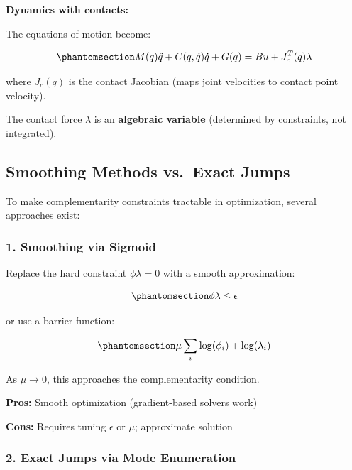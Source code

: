 \documentclass[
  letterpaper,
  DIV=11,
  numbers=noendperiod]{scrartcl}
\begin{document}
\textbf{Dynamics with contacts:}

The equations of motion become:

\begin{equation}\phantomsection\label{eq-contact-dynamics}{
M(q)\ddot{q} + C(q, \dot{q})\dot{q} + G(q) = B u + J_c^T(q) \lambda
}\end{equation}

where \(J_c(q)\) is the contact Jacobian (maps joint velocities to
contact point velocity).

The contact force \(\lambda\) is an \textbf{algebraic variable}
(determined by constraints, not integrated).

\subsection{Smoothing Methods vs.~Exact
Jumps}\label{smoothing-methods-vs.-exact-jumps}

To make complementarity constraints tractable in optimization, several
approaches exist:

\subsubsection{1. Smoothing via Sigmoid}\label{smoothing-via-sigmoid}

Replace the hard constraint \(\phi \lambda = 0\) with a smooth
approximation:

\begin{equation}\phantomsection\label{eq-smooth-complementarity}{
\phi \lambda \leq \epsilon
}\end{equation}

or use a barrier function:

\begin{equation}\phantomsection\label{eq-barrier}{
\mu \sum_i \log(\phi_i) + \log(\lambda_i)
}\end{equation}

As \(\mu \to 0\), this approaches the complementarity condition.

\textbf{Pros:} Smooth optimization (gradient-based solvers work)

\textbf{Cons:} Requires tuning \(\epsilon\) or \(\mu\); approximate
solution

\subsubsection{2. Exact Jumps via Mode
Enumeration}\label{exact-jumps-via-mode-enumeration}
\end{document}

